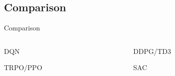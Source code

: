 \subsection{Comparison}
\begin{frame}{Comparison}
    \begin{columns}
    \begin{column}{0.5\textwidth}
    \begin{block}{DQN}
    
    \end{block}
    \begin{block}{TRPO/PPO}
    
    \end{block}
    \end{column}
    \begin{column}{0.5\textwidth}
        \begin{block}{DDPG/TD3}
    
    \end{block}
    \begin{block}{SAC}
    
    \end{block}
    \end{column}
    \end{columns}

\end{frame}